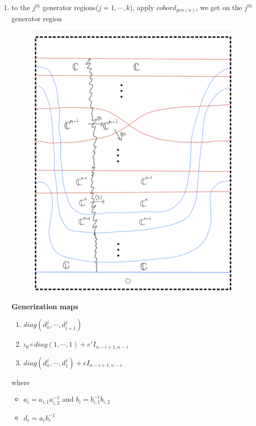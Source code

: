 \begin{enumerate}[label = (Step \arabic*)]
\item to the $j^{th}$ generator regions($j=1,\cdots,k$), apply $cobord_{gen(n)}$, we get on the $j^{th}$ generator region
\begin{figure}[H]
    \centering
    \includegraphics[scale = 1.1]{diagrams/cobord_full/3.png}
    \caption{}
    \label{fig:your-label}
\end{figure}
\textbf{Generization maps}
\begin{enumerate}
\item $diag(d^j_n,\cdots, d^j_{i+1})$
\item $\iota_0 \circ diag(1,\cdots, 1) + e'I_{n-i+1,n-i}$
\item $diag(d^j_n,\cdots, d^j_{1})+ eI_{n-i+1,n-i}$
\end{enumerate}
where
\begin{itemize}
\item $a_i=a_{i,1}a_{i,2}^{-1}$ and $b_i=b_{i,1}^{-1}b_{i,2}$
\item $d_r = a_rb_r^{-1}$

\end{itemize}
\end{enumerate}
